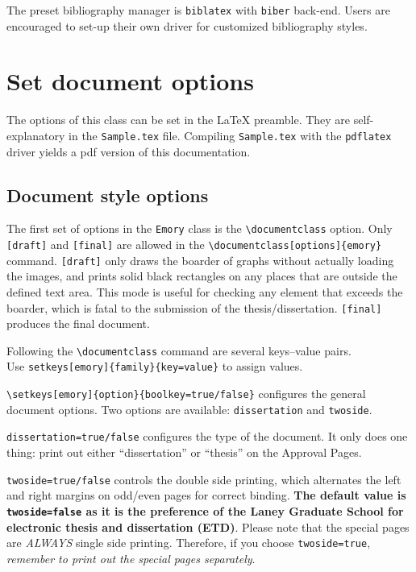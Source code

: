 \documentclass[final]{emory}
\begin{document}
The preset bibliography manager is \Verb|biblatex| with \Verb|biber| back-end. 
Users are encouraged to set-up their own \BibTeX{} driver for customized bibliography styles.


\section{Set document options}\label{sec:options}
The options of this class can be set in the \LaTeX{} preamble. They are 
self-explanatory in the \Verb|Sample.tex| file.
Compiling \Verb|Sample.tex| with the \Verb|pdflatex| driver yields a pdf version of this documentation.

\subsection{Document style options}
The first set of options in the \Verb|Emory| class is the \Verb|\documentclass| option.
Only \Verb|[draft]| and \Verb|[final]| are allowed in the 
\Verb|\documentclass[options]{emory}| command.
\Verb|[draft]| only draws the boarder of graphs without actually loading the images,
and prints solid black rectangles on any places that are outside the defined text area. 
This mode is useful for checking any element that exceeds the boarder,
which is fatal to the submission of the thesis/dissertation.
\Verb|[final]| produces the final document. 

Following the \Verb|\documentclass| command are several keys--value pairs.\\
Use \Verb|setkeys[emory]{family}{key=value}| to assign values.

\Verb|\setkeys[emory]{option}{boolkey=true/false}| configures the general document options.
Two options are available: \Verb|dissertation| and \Verb|twoside|.

\Verb|dissertation=true/false| configures the type of the document. 
It only does one thing: print out either ``dissertation'' or ``thesis'' on the 
Approval Pages.

\Verb|twoside=true/false| controls the double side printing, which alternates the left and right margins on odd/even pages for correct binding.
\textbf{The default value is \Verb|twoside=false| as it is the preference of the Laney Graduate School for electronic thesis and dissertation (ETD)}. 
Please note that the special pages are \emph{ALWAYS} single side printing. 
Therefore, if you choose \Verb|twoside=true|, \emph{remember to print out the special pages separately}.
\end{document}
